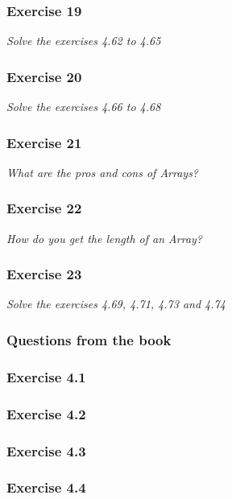 \subsubsection*{Exercise 19}
\textit{Solve the exercises 4.62 to 4.65}\\

\subsubsection*{Exercise 20}
\textit{Solve the exercises 4.66 to 4.68}\\

\subsubsection*{Exercise 21}
\textit{What are the pros and cons of Arrays?}\\

\subsubsection*{Exercise 22}
\textit{How do you get the length of an Array?}\\

\subsubsection*{Exercise 23}
\textit{Solve the exercises 4.69, 4.71, 4.73 and 4.74}\\

\subsubsection{Questions from the book}

\subsubsection{Exercise 4.1}

\subsubsection{Exercise 4.2}

\subsubsection{Exercise 4.3}

\subsubsection{Exercise 4.4}

